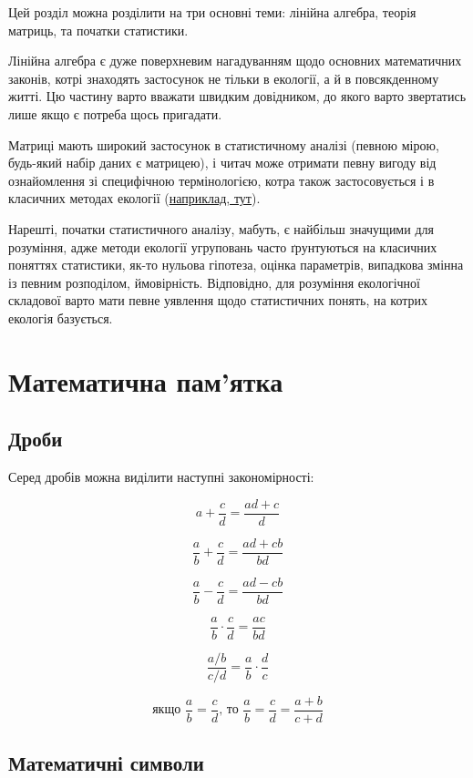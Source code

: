 \documentclass[
  11pt,
]{book}
\begin{document}
Цей розділ можна розділити на три основні теми: лінійна алгебра, теорія матриць, та початки статистики.

Лінійна алгебра є дуже поверхневим нагадуванням щодо основних математичних законів, котрі знаходять застосунок не тільки в екології, а й в повсякденному житті. Цю частину варто вважати швидким довідником, до якого варто звертатись лише якщо є потреба щось пригадати.

Матриці мають широкий застосунок в статистичному аналізі (певною мірою, будь-який набір даних є матрицею), і читач може отримати певну вигоду від ознайомлення зі специфічною термінологією, котра також застосовується і в класичних методах екології (\hyperref[Leslie-matrix]{наприклад, тут}).

Нарешті, початки статистичного аналізу, мабуть, є найбільш значущими для розуміння, адже методи екології угруповань часто ґрунтуються на класичних поняттях статистики, як-то нульова гіпотеза, оцінка параметрів, випадкова змінна із певним розподілом, ймовірність. Відповідно, для розуміння екологічної складової варто мати певне уявлення щодо статистичних понять, на котрих екологія базується.

\section{Математична пам'ятка}\label{algebra}

\subsection{Дроби}\label{ux434ux440ux43eux431ux438}

Серед дробів можна виділити наступні закономірності:

\[a+\frac{c}{d} = \frac{ad+c}{d}\]

\[\frac{a}{b}+\frac{c}{d} = \frac{ad+cb}{bd}\]

\[\frac{a}{b} - \frac{c}{d} = \frac{ad-cb}{bd}\]

\[\frac{a}{b} \cdot \frac{c}{d} = \frac{ac}{bd}\]

\[\frac{a/b}{c/d} = \frac{a}{b} \cdot \frac{d}{c}\]

\[\text{якщо } \frac{a}{b} = \frac{c}{d} \text{, то } \frac{a}{b} = \frac{c}{d} = \frac{a+b}{c+d}\]

\subsection{Математичні символи}\label{ux43cux430ux442ux435ux43cux430ux442ux438ux447ux43dux456-ux441ux438ux43cux432ux43eux43bux438}
\end{document}
